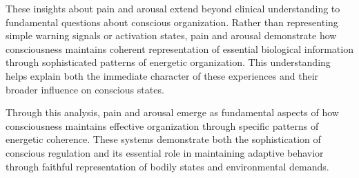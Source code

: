 These insights about pain and arousal extend beyond clinical understanding to fundamental questions about conscious organization. Rather than representing simple warning signals or activation states, pain and arousal demonstrate how consciousness maintains coherent representation of essential biological information through sophisticated patterns of energetic organization. This understanding helps explain both the immediate character of these experiences and their broader influence on conscious states.

Through this analysis, pain and arousal emerge as fundamental aspects of how consciousness maintains effective organization through specific patterns of energetic coherence. These systems demonstrate both the sophistication of conscious regulation and its essential role in maintaining adaptive behavior through faithful representation of bodily states and environmental demands.

